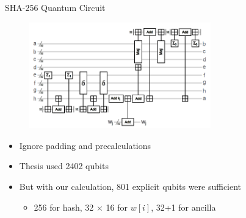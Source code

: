 \documentclass{beamer}
\begin{document}
    \begin{frame}{SHA-256 Quantum Circuit}
        \begin{figure}[h]
            \centering
            \includegraphics[width=0.7\textwidth]{./Images/quant-sha2-qcirc.png}
        \end{figure}
        \begin{itemize}
            \item Ignore padding and precalculations
            \item Thesis used 2402 qubits
            \item But with our calculation, 801 explicit qubits were sufficient
            \begin{itemize}
                \item 256 for hash, 32 $ \times $ 16 for $ w[i] $, 32+1 for ancilla
            \end{itemize}
        \end{itemize}
    \end{frame}
    
\end{document}
